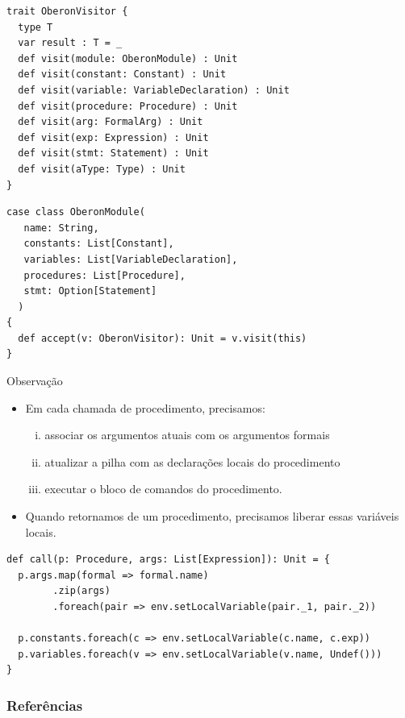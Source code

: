 \documentclass{beamer}
\begin{document}
\begin{frame}[fragile]
  \begin{lstlisting}
trait OberonVisitor {
  type T
  var result : T = _
  def visit(module: OberonModule) : Unit
  def visit(constant: Constant) : Unit
  def visit(variable: VariableDeclaration) : Unit
  def visit(procedure: Procedure) : Unit
  def visit(arg: FormalArg) : Unit
  def visit(exp: Expression) : Unit
  def visit(stmt: Statement) : Unit
  def visit(aType: Type) : Unit
}
  \end{lstlisting} 
\end{frame}

\begin{frame}[fragile]
\begin{scriptsize}  
  \begin{lstlisting}
case class OberonModule(
   name: String,
   constants: List[Constant],
   variables: List[VariableDeclaration],
   procedures: List[Procedure],
   stmt: Option[Statement]
  )
{
  def accept(v: OberonVisitor): Unit = v.visit(this)
}
  \end{lstlisting}
\end{scriptsize}  
\end{frame}


\begin{frame}
  \begin{block}{Observa\c c\~{a}o}
   \begin{itemize}
   \item Em cada chamada de procedimento, precisamos:
     \begin{enumerate}[(i)]
      \item associar os argumentos atuais com os argumentos formais \faStar
      \item atualizar a pilha com as declara\c c\~{o}es locais do procedimento
      \item executar o bloco de comandos do procedimento. \pause
     \end{enumerate}   
    \item  Quando retornamos de um procedimento, precisamos {\color{blue}liberar}
     essas vari\'{a}veis locais.  
  \end{itemize}
 \end{block} 
\end{frame}

\begin{frame}[fragile]
  \begin{scriptsize}
    \begin{lstlisting}
def call(p: Procedure, args: List[Expression]): Unit = {
  p.args.map(formal => formal.name)
        .zip(args)
        .foreach(pair => env.setLocalVariable(pair._1, pair._2))

  p.constants.foreach(c => env.setLocalVariable(c.name, c.exp))
  p.variables.foreach(v => env.setLocalVariable(v.name, Undef()))
}
    \end{lstlisting}  
  \end{scriptsize}
\end{frame}

\begin{frame}[t, allowframebreaks]
  \frametitle{Refer\^{e}ncias}
  
 
\end{frame}

\begin{frame}
\titlepage
\end{frame}
\end{document}

